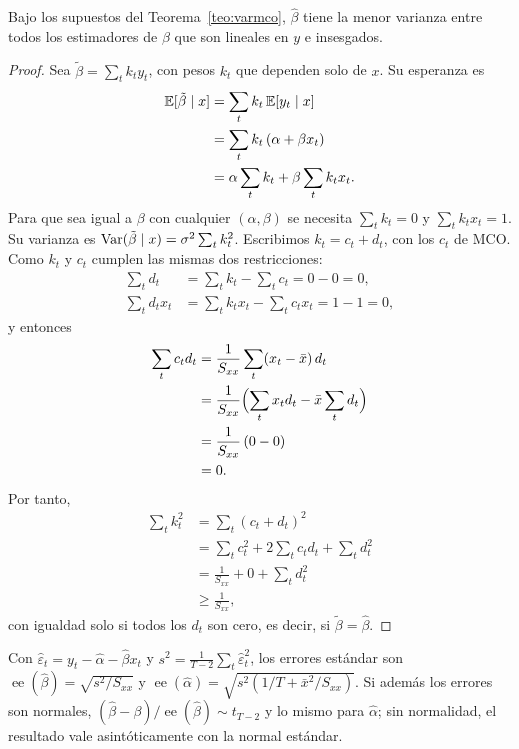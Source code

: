 \begin{teorema}\label{teo:gm}
Bajo los supuestos del Teorema~\ref{teo:varmco}, $\hat\beta$ tiene la menor varianza entre todos los
estimadores de $\beta$ que son lineales en $y$ e insesgados.
\end{teorema}

\begin{proof}
Sea $\tilde\beta=\sum_tk_ty_t$, con pesos $k_t$ que dependen solo de $x$. Su esperanza es
\begin{align*}
  \mathbb{E}[\tilde\beta\mid x] &= \sum_tk_t\,\mathbb{E}[y_t\mid x]\\
                        &= \sum_tk_t\,(\alpha+\beta x_t)\\
                        &= \alpha\sum_tk_t+\beta\sum_tk_tx_t .
\end{align*}
Para que sea igual a $\beta$ con cualquier $(\alpha,\beta)$ se necesita $\sum_tk_t=0$ y $\sum_tk_tx_t=1$. Su
varianza es $\operatorname{Var}(\tilde\beta\mid x)=\sigma^2\sum_tk_t^2$. Escribimos $k_t=c_t+d_t$, con los $c_t$ de MCO.
Como $k_t$ y $c_t$ cumplen las mismas dos restricciones:
\begin{align*}
  \sum_td_t    &= \sum_tk_t-\sum_tc_t = 0-0 = 0,\\
  \sum_td_tx_t &= \sum_tk_tx_t-\sum_tc_tx_t = 1-1 = 0,
\end{align*}
y entonces
\begin{align*}
  \sum_tc_td_t &= \frac{1}{S_{xx}}\sum_t(x_t-\bar x)\,d_t\\
               &= \frac{1}{S_{xx}}\Bigl(\sum_tx_td_t-\bar x\sum_td_t\Bigr)\\
               &= \frac{1}{S_{xx}}\,(0-0)\\
               &= 0 .
\end{align*}
Por tanto,
\begin{align*}
  \sum_tk_t^2 &= \sum_t(c_t+d_t)^2\\
              &= \sum_tc_t^2+2\sum_tc_td_t+\sum_td_t^2\\
              &= \frac{1}{S_{xx}}+0+\sum_td_t^2\\
              &\ge \frac{1}{S_{xx}},
\end{align*}
con igualdad solo si todos los $d_t$ son cero, es decir, si $\tilde\beta=\hat\beta$.
\end{proof}

\begin{proposicion}[Inferencia]\label{prop:inferencia}
Con $\hat\varepsilon_t=y_t-\hat\alpha-\hat\beta x_t$ y $s^2=\frac{1}{T-2}\sum_t\hat\varepsilon_t^2$, los
errores estándar son $\operatorname{ee}(\hat\beta)=\sqrt{s^2/S_{xx}}$ y
$\operatorname{ee}(\hat\alpha)=\sqrt{s^2(1/T+\bar x^2/S_{xx})}$. Si además los errores son normales,
$(\hat\beta-\beta)/\operatorname{ee}(\hat\beta)\sim t_{T-2}$ y lo mismo para $\hat\alpha$; sin
normalidad, el resultado vale asintóticamente con la normal estándar.
\end{proposicion}

